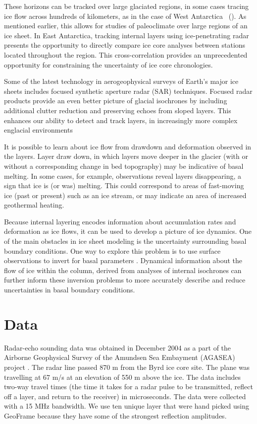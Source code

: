 \documentclass[jgrga]{agutex}
\begin{document}
\begin{article}
These horizons can be tracked over large glaciated regions, in some cases tracing ice flow across hundreds of kilometers, as in the case of West Antarctica ~(\citet[e.g.]{holt2006}). As mentioned earlier, this allows for studies of paleoclimate over large regions of an ice sheet. In East Antarctica, tracking internal layers using ice-penetrating radar presents the opportunity to directly compare ice core analyses between stations located throughout the region. This cross-correlation provides an unprecedented opportunity for constraining the uncertainty of ice core chronologies. 

Some of the latest technology in aerogeophysical surveys of Earth’s major ice sheets includes focused synthetic aperture radar (SAR) techniques. Focused radar products provide an even better picture of glacial isochrones by including additional clutter reduction and preserving echoes from sloped layers. This enhances our ability to detect and track layers, in increasingly more complex englacial environments \citep{peters2006}

It is possible to learn about ice flow from drawdown and deformation observed in the layers. Layer draw down, in which layers move deeper in the glacier (with or without a corresponding change in bed topography) may be indicative of basal melting. In some cases, for example, observations reveal layers disappearing, a sign that ice is (or was) melting. This could correspond to areas of fast-moving ice (past or present) such as an ice stream, or may indicate an area of increased geothermal heating. 

Because internal layering encodes information about accumulation rates and deformation as ice flows, it can be used to develop a picture of ice dynamics. One of the main obstacles in ice sheet modeling is the uncertainty surrounding basal boundary conditions. One way to explore this problem is to use surface observations to invert for basal parameters \citep{thorsteinsson2003}. Dynamical information about the flow of ice within the column, derived from analyses of internal isochrones can further inform these inversion problems to more accurately describe and reduce uncertainties in basal boundary conditions. 


\section{Data}

Radar-echo sounding data was obtained in December 2004 as a part of the Airborne Geophysical Survey of the Amundsen Sea Embayment (AGASEA) project \citep{holt2006}. The radar line passed 870 m from the Byrd ice core site. The plane was travelling at 67 m/s at an elevation of 550 m above the ice. The data includes two-way travel times (the time it takes for a radar pulse to be transmitted, reflect off a layer, and return to the receiver) in microseconds. The data were collected with a 15 MHz bandwidth. We use ten unique layer that were hand picked using GeoFrame because they have some of the strongest reflection amplitudes.


\end{article}
\end{document}
